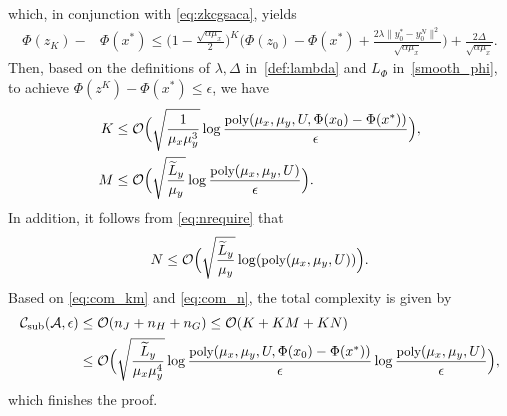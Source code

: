 \documentclass{osudissert96}
\begin{document}
which, in conjunction with \cref{eq:zkcgsaca}, yields  
\begin{align*}
\Phi(z_{K})-&\Phi(x^*) \leq  \big(1-\frac{\sqrt{\alpha\mu_x}}{2}\big)^K\Big(\Phi(z_{0})-\Phi(x^*)+\frac{2\lambda  \|y_0^*-y_0^N\|^2}{\sqrt{\alpha\mu_x}}\Big)+ \frac{2\Delta}{\sqrt{\alpha\mu_x}}. 
\end{align*}
Then, based on the definitions of $\lambda,\Delta$ in~\cref{def:lambda} and $L_\Phi$ in~\cref{smooth_phi}, to achieve $\Phi(z^K)-\Phi(x^*)\leq \epsilon$, we have 
\begin{align}\label{eq:com_km}
K&\leq \mathcal{O}\Big( \sqrt{\frac{1}{\mu_x\mu_y^3}}\log\frac{\mbox{\small poly}(\mu_x,\mu_y,U,\Phi(x_{0})-\Phi(x^*))}{\epsilon} \Big), \nonumber
\\M &\leq \mathcal{O} \Big(\sqrt{\frac{\widetilde L_y}{\mu_y}}\log \frac{\mbox{\small poly}(\mu_x,\mu_y,U)}{\epsilon}\Big).
\end{align}
In addition, it follows from \cref{eq:nrequire} that 
\begin{align}\label{eq:com_n}
N\leq \mathcal{O}\Big(\sqrt{\frac{\widetilde L_y}{\mu_y}}\log (\mbox{\small poly}(\mu_x,\mu_y,U))\Big).
\end{align} 
Based on \cref{eq:com_km} and \cref{eq:com_n}, the total complexity is given by 
\begin{align*}
\mathcal{C}_{\text{\normalfont sub}}(\mathcal{A},\epsilon) &\leq \mathcal{O}(n_J+n_H + n_G)\leq \mathcal{O}(K+KM+KN) \nonumber
\\&\leq \mathcal{O}\Big(\sqrt{\frac{\widetilde L_y}{\mu_x\mu_y^4}}\log\frac{\mbox{\small poly}(\mu_x,\mu_y,U,\Phi(x_{0})-\Phi(x^*))}{\epsilon}  \log \frac{\mbox{\small poly}(\mu_x,\mu_y,U)}{\epsilon} \Big), 
\end{align*}
which finishes the proof. 
\end{document}
